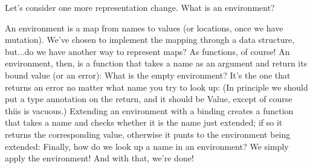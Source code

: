 
Let’s consider one more representation change. What is an environment?

An environment is a map from names to values (or locations, once we have
mutation). We’ve chosen to implement the mapping through a data structure,
but...do we have another way to represent maps? As functions, of course! An
environment, then, is a function that takes a name as an argument and return its
bound value (or an error):
What is the empty environment? It’s the one that returns an error no matter what
name you try to look up:
(In principle we should put a type annotation on the return, and it should be
Value, except of course thiis is vacuous.) Extending an environment with a
binding creates a function that takes a name and checks whether it is the name
just extended; if so it returns the corresponding value, otherwise it punts to
the environment being extended:
Finally, how do we look up a name in an environment? We simply apply the
environment!
And with that, we’re done!

